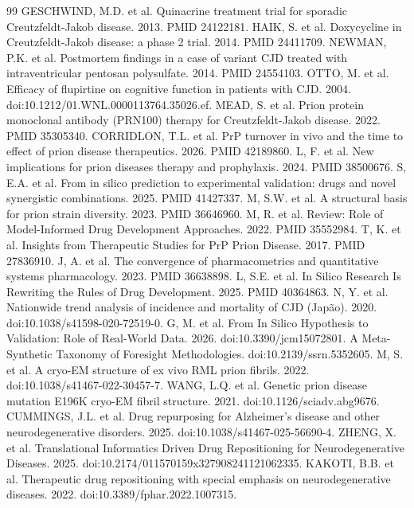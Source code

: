 \documentclass[12pt,a4paper,oneside]{report}
\begin{document}
\begin{thebibliography}{99}
 GESCHWIND, M.D. et al. Quinacrine treatment trial for sporadic Creutzfeldt-Jakob disease. 2013. PMID 24122181.
 HAIK, S. et al. Doxycycline in Creutzfeldt-Jakob disease: a phase 2 trial. 2014. PMID 24411709.
 NEWMAN, P.K. et al. Postmortem findings in a case of variant CJD treated with intraventricular pentosan polysulfate. 2014. PMID 24554103.
 OTTO, M. et al. Efficacy of flupirtine on cognitive function in patients with CJD. 2004. doi:10.1212/01.WNL.0000113764.35026.ef.
 MEAD, S. et al. Prion protein monoclonal antibody (PRN100) therapy for Creutzfeldt-Jakob disease. 2022. PMID 35305340.
 CORRIDLON, T.L. et al. PrP turnover in vivo and the time to effect of prion disease therapeutics. 2026. PMID 42189860.
 L, F. et al. New implications for prion diseases therapy and prophylaxis. 2024. PMID 38500676.
 S, E.A. et al. From in silico prediction to experimental validation: drugs and novel synergistic combinations. 2025. PMID 41427337.
 M, S.W. et al. A structural basis for prion strain diversity. 2023. PMID 36646960.
 M, R. et al. Review: Role of Model-Informed Drug Development Approaches. 2022. PMID 35552984.
 T, K. et al. Insights from Therapeutic Studies for PrP Prion Disease. 2017. PMID 27836910.
 J, A. et al. The convergence of pharmacometrics and quantitative systems pharmacology. 2023. PMID 36638898.
 L, S.E. et al. In Silico Research Is Rewriting the Rules of Drug Development. 2025. PMID 40364863.
 N, Y. et al. Nationwide trend analysis of incidence and mortality of CJD (Japão). 2020. doi:10.1038/s41598-020-72519-0.
 G, M. et al. From In Silico Hypothesis to Validation: Role of Real-World Data. 2026. doi:10.3390/jcm15072801.
 A Meta-Synthetic Taxonomy of Foresight Methodologies. doi:10.2139/ssrn.5352605.
 M, S. et al. A cryo-EM structure of ex vivo RML prion fibrils. 2022. doi:10.1038/s41467-022-30457-7.
 WANG, L.Q. et al. Genetic prion disease mutation E196K cryo-EM fibril structure. 2021. doi:10.1126/sciadv.abg9676.
 CUMMINGS, J.L. et al. Drug repurposing for Alzheimer's disease and other neurodegenerative disorders. 2025. doi:10.1038/s41467-025-56690-4.
 ZHENG, X. et al. Translational Informatics Driven Drug Repositioning for Neurodegenerative Diseases. 2025. doi:10.2174/011570159x327908241121062335.
 KAKOTI, B.B. et al. Therapeutic drug repositioning with special emphasis on neurodegenerative diseases. 2022. doi:10.3389/fphar.2022.1007315.

\end{thebibliography}
\end{document}

